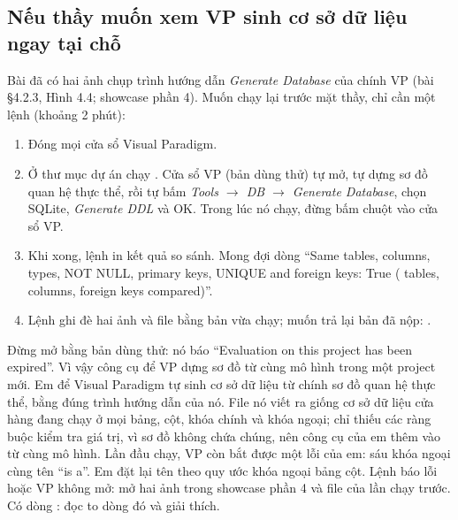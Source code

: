 \subsection{Nếu thầy muốn xem VP sinh cơ sở dữ liệu ngay tại chỗ}\label{sec:vpgen}
Bài đã có hai ảnh chụp trình hướng dẫn \emph{Generate Database} của chính VP (bài §4.2.3, Hình 4.4; showcase phần 4). Muốn chạy lại trước mặt thầy, chỉ cần một lệnh (khoảng 2 phút):
\begin{enumerate}[leftmargin=1.5em]
\item Đóng mọi cửa sổ Visual Paradigm.
\item Ở thư mục dự án chạy . Cửa sổ VP (bản dùng thử) tự mở, tự dựng sơ đồ quan hệ thực thể, rồi tự bấm \emph{Tools $\to$ DB $\to$ Generate Database}, chọn SQLite, \emph{Generate DDL} và OK. Trong lúc nó chạy, đừng bấm chuột vào cửa sổ VP.
\item Khi xong, lệnh in kết quả so sánh. Mong đợi dòng ``Same tables, columns, types, NOT NULL, primary keys, UNIQUE and foreign keys: True (\factCheckTables{} tables, \factCmpColumns{} columns, \factCmpFKs{} foreign keys compared)''.
\item Lệnh ghi đè hai ảnh và file  bằng bản vừa chạy; muốn trả lại bản đã nộp: .
\end{enumerate}
Đừng mở  bằng bản dùng thử: nó báo ``Evaluation on this project has been expired''. Vì vậy công cụ để VP dựng sơ đồ từ cùng mô hình trong một project mới.
Em để Visual Paradigm tự sinh cơ sở dữ liệu từ chính sơ đồ quan hệ thực thể, bằng đúng trình hướng dẫn của nó. File nó viết ra giống cơ sở dữ liệu cửa hàng đang chạy ở mọi bảng, cột, khóa chính và khóa ngoại; chỉ thiếu các ràng buộc kiểm tra giá trị, vì sơ đồ không chứa chúng, nên công cụ của em thêm vào từ cùng mô hình. Lần đầu chạy, VP còn bắt được một lỗi của em: sáu khóa ngoại cùng tên ``is a''. Em đặt lại tên theo quy ước khóa ngoại bảng cột.
Lệnh báo lỗi hoặc VP không mở: mở hai ảnh trong showcase phần 4 và file  của lần chạy trước. Có dòng : đọc to dòng đó và giải thích.
